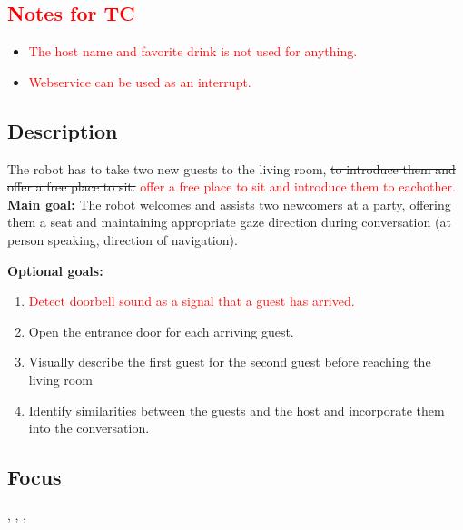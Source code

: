 \subsection*{\textcolor{red}{Notes for TC}}
	\begin{itemize}
	\item \textcolor{red}{The host name and favorite drink is not used for anything.}
	\item \textcolor{red}{Webservice can be used as an interrupt.}
	\end{itemize}

\subsection*{Description}
The robot has to take two new guests to the living room, \sout{to introduce them and offer a free place to sit.} \textcolor{red}{offer a free place to sit and introduce them to eachother.}\\
    
\textbf{Main goal:}
    The robot welcomes and assists two newcomers at a party, offering them a seat and maintaining appropriate gaze direction during conversation (at person speaking, direction of navigation).

\textbf{Optional goals:}
\begin{enumerate}[nosep]
	\item \textcolor{red}{Detect doorbell sound as a signal that a guest has arrived.}
	\item Open the entrance door for each arriving guest.
	\item Visually describe the first guest for the second guest before reaching the living room
	\item Identify similarities between the guests and the host and incorporate them into the conversation.
\end{enumerate}

\subsection*{Focus}
\SysI{}, \HRI{}, \PerDet{}, \PerRec{}

